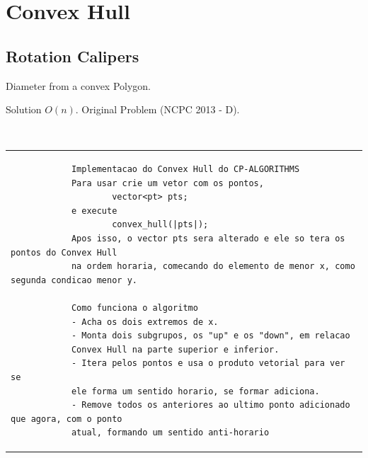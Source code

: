
    \section{Convex Hull}
        \subsection{Rotation Calipers}
        Diameter from a convex Polygon.
        
        Solution $O(n)$. Original Problem (NCPC 2013 - D).
        
        \ \\
        
        \begin{tabular}{|p{31cm}|}
          \begin{verbatim}
            Implementacao do Convex Hull do CP-ALGORITHMS
            Para usar crie um vetor com os pontos,
            		vector<pt> pts;
            e execute
            		convex_hull(|pts|);
            Apos isso, o vector pts sera alterado e ele so tera os pontos do Convex Hull 
            na ordem horaria, comecando do elemento de menor x, como segunda condicao menor y.
            
            Como funciona o algoritmo
            - Acha os dois extremos de x.
            - Monta dois subgrupos, os "up" e os "down", em relacao
            Convex Hull na parte superior e inferior.
            - Itera pelos pontos e usa o produto vetorial para ver se
            ele forma um sentido horario, se formar adiciona.
            - Remove todos os anteriores ao ultimo ponto adicionado que agora, com o ponto
            atual, formando um sentido anti-horario
            \end{verbatim}
        \end{tabular}
        \\
        
